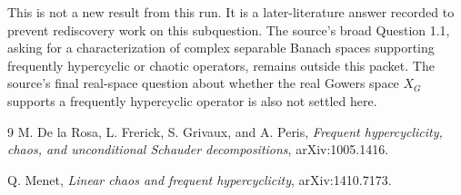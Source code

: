 \documentclass[11pt]{article}
\begin{document}
This is not a new result from this run.  It is a later-literature answer
recorded to prevent rediscovery work on this subquestion.  The source's broad
Question 1.1, asking for a characterization of complex separable Banach spaces
supporting frequently hypercyclic or chaotic operators, remains outside this
packet.  The source's final real-space question about whether the real
Gowers space \(X_G\) supports a frequently hypercyclic operator is also not
settled here.

\begin{thebibliography}{9}
M. De la Rosa, L. Frerick, S. Grivaux, and A. Peris,
\emph{Frequent hypercyclicity, chaos, and unconditional Schauder decompositions},
arXiv:1005.1416.

Q. Menet,
\emph{Linear chaos and frequent hypercyclicity},
arXiv:1410.7173.
\end{thebibliography}
\end{document}
